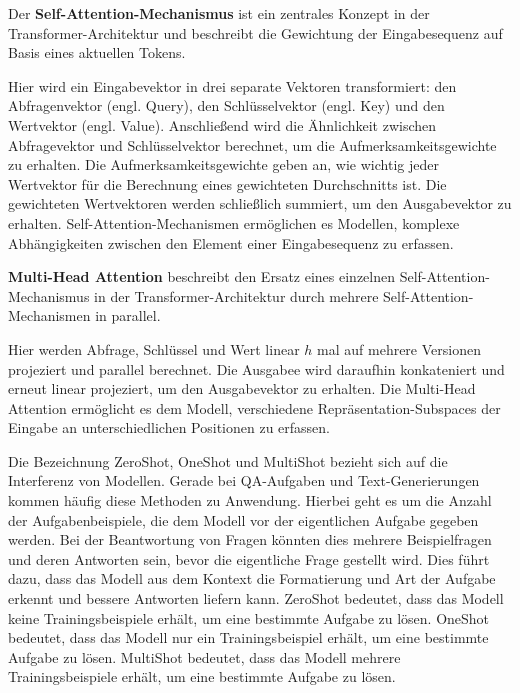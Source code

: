 \begin{definition}\label{def:self-attention-mechanismus}
    Der \textbf{Self-Attention-Mechanismus} ist ein zentrales Konzept in der Transformer-Architektur und beschreibt die Gewichtung der Eingabesequenz auf Basis eines aktuellen Tokens.
\end{definition}
Hier wird ein Eingabevektor in drei separate Vektoren transformiert:
den Abfragenvektor (engl. Query), den Schlüsselvektor (engl. Key) und den Wertvektor (engl. Value).
Anschließend wird die Ähnlichkeit zwischen Abfragevektor und Schlüsselvektor berechnet,
um die Aufmerksamkeitsgewichte zu erhalten.
Die Aufmerksamkeitsgewichte geben an, wie wichtig jeder Wertvektor für die Berechnung eines gewichteten
Durchschnitts ist. Die gewichteten Wertvektoren werden schließlich summiert, um den Ausgabevektor zu erhalten.
Self-Attention-Mechanismen ermöglichen es Modellen, komplexe Abhängigkeiten zwischen den Element einer Eingabesequenz zu erfassen.\\

\begin{definition}\label{def:multi-head-attention}
    \textbf{Multi-Head Attention} beschreibt den Ersatz eines einzelnen Self-Attention-Mechanismus in der Transformer-Architektur durch mehrere Self-Attention-Mechanismen in parallel.
\end{definition}
Hier werden Abfrage, Schlüssel und Wert linear $h$ mal auf mehrere Versionen projeziert und parallel berechnet. Die Ausgabee wird daraufhin konkateniert und erneut linear projeziert, um den Ausgabevektor zu erhalten. Die Multi-Head Attention ermöglicht es dem Modell, verschiedene Repräsentation-Subspaces der Eingabe an unterschiedlichen Positionen zu erfassen.

\begin{definition}\label{def:zeroshot-oneshot-multishot}
    Die Bezeichnung ZeroShot, OneShot und MultiShot bezieht sich auf die Interferenz von Modellen.
    Gerade bei \ac{QA}-Aufgaben und Text-Generierungen kommen häufig diese Methoden zu Anwendung.
    Hierbei geht es um die Anzahl der Aufgabenbeispiele, die dem Modell vor der eigentlichen Aufgabe gegeben werden.
    Bei der Beantwortung von Fragen könnten dies mehrere Beispielfragen und deren Antworten sein, bevor die eigentliche Frage gestellt wird.
    Dies führt dazu, dass das Modell aus dem Kontext die Formatierung und Art der Aufgabe erkennt und bessere Antworten liefern kann.
    ZeroShot bedeutet, dass das Modell keine Trainingsbeispiele erhält, um eine bestimmte Aufgabe zu lösen.
    OneShot bedeutet, dass das Modell nur ein Trainingsbeispiel erhält, um eine bestimmte Aufgabe zu lösen.
    MultiShot bedeutet, dass das Modell mehrere Trainingsbeispiele erhält, um eine bestimmte Aufgabe zu lösen.
\end{definition}

